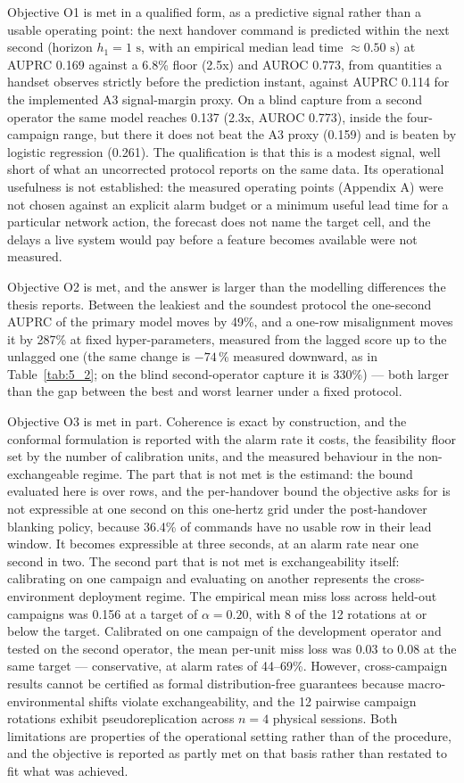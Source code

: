 Objective O1 is met in a qualified form, as a predictive signal rather than a usable operating point: the next handover command is predicted within the next second (horizon $h_1 = 1\text{ s}$, with an empirical median lead time $\approx 0.50\text{ s}$) at AUPRC 0.169 against a 6.8\% floor (2.5x) and AUROC 0.773, from quantities a handset observes strictly before the prediction instant, against AUPRC 0.114 for the implemented A3 signal-margin proxy. On a blind capture from a second operator the same model reaches 0.137 (2.3x, AUROC 0.773), inside the four-campaign range, but there it does not beat the A3 proxy (0.159) and is beaten by logistic regression (0.261). The qualification is that this is a modest signal, well short of what an uncorrected protocol reports on the same data. Its operational usefulness is not established: the measured operating points (Appendix A) were not chosen against an explicit alarm budget or a minimum useful lead time for a particular network action, the forecast does not name the target cell, and the delays a live system would pay before a feature becomes available were not measured.

Objective O2 is met, and the answer is larger than the modelling differences the thesis reports. Between the leakiest and the soundest protocol the one-second AUPRC of the primary model moves by 49\%, and a one-row misalignment moves it by 287\% at fixed hyper-parameters, measured from the lagged score up to the unlagged one (the same change is $-74$\,\% measured downward, as in Table~\ref{tab:5_2}; on the blind second-operator capture it is 330\%) --- both larger than the gap between the best and worst learner under a fixed protocol.

Objective O3 is met in part. Coherence is exact by construction, and the conformal formulation is reported with the alarm rate it costs, the feasibility floor set by the number of calibration units, and the measured behaviour in the non-exchangeable regime. The part that is not met is the estimand: the bound evaluated here is over rows, and the per-handover bound the objective asks for is not expressible at one second on this one-hertz grid under the post-handover blanking policy, because 36.4\% of commands have no usable row in their lead window. It becomes expressible at three seconds, at an alarm rate near one second in two. The second part that is not met is exchangeability itself: calibrating on one campaign and evaluating on another represents the cross-environment deployment regime. The empirical mean miss loss across held-out campaigns was 0.156 at a target of $\alpha = 0.20$, with 8 of the 12 rotations at or below the target. Calibrated on one campaign of the development operator and tested on the second operator, the mean per-unit miss loss was 0.03 to 0.08 at the same target --- conservative, at alarm rates of 44--69\%. However, cross-campaign results cannot be certified as formal distribution-free guarantees because macro-environmental shifts violate exchangeability, and the 12 pairwise campaign rotations exhibit pseudoreplication across $n=4$ physical sessions. Both limitations are properties of the operational setting rather than of the procedure, and the objective is reported as partly met on that basis rather than restated to fit what was achieved.

